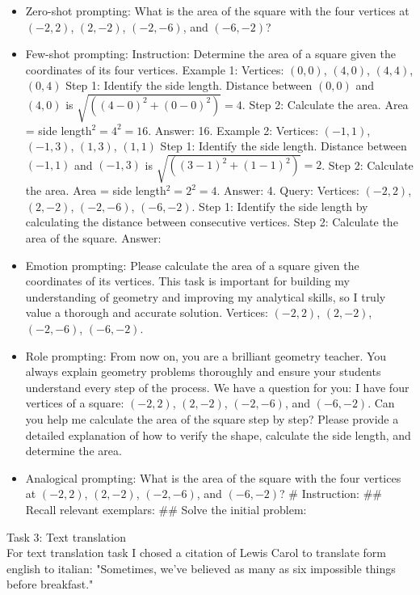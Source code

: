 \begin{itemize}
    \item Zero-shot prompting: What is the area of the square with the four vertices at $(-2, 2)$, $(2, -2)$, $(-2, -6)$, and $(-6, -2)$?
    \item Few-shot prompting: Instruction: Determine the area of a square given the coordinates of its four vertices. 
    Example 1: Vertices: $(0, 0)$, $(4, 0)$, $(4, 4)$, $(0, 4)$ 
    Step 1: Identify the side length. Distance between $(0, 0)$ and $(4, 0)$ is $\sqrt{((4 - 0)^2 + (0 - 0)^2)} = 4$. 
    Step 2: Calculate the area. Area = side length$^2 = 4^2 = 16$. Answer: 16. 
    Example 2: Vertices: $(-1, 1)$, $(-1, 3)$, $(1, 3)$, $(1, 1)$ 
    Step 1: Identify the side length. Distance between $(-1, 1)$ and $(-1, 3)$ is $\sqrt{((3 - 1)^2 + (1 - 1)^2)} = 2$. 
    Step 2: Calculate the area. Area = side length$^2 = 2^2 = 4$. Answer: 4. 
    Query: Vertices: $(-2, 2)$, $(2, -2)$, $(-2, -6)$, $(-6, -2)$. 
    Step 1: Identify the side length by calculating the distance between consecutive vertices. 
    Step 2: Calculate the area of the square. Answer:
    \item Emotion prompting: Please calculate the area of a square given the coordinates of its vertices. This task is important for building my understanding of geometry and improving my analytical skills, so I truly value a thorough and accurate solution. Vertices: $(-2, 2)$, $(2, -2)$, $(-2, -6)$, $(-6, -2)$.
    \item Role prompting: From now on, you are a brilliant geometry teacher. You always explain geometry problems thoroughly and ensure your students understand every step of the process. We have a question for you: I have four vertices of a square: $(-2, 2)$, $(2, -2)$, $(-2, -6)$, and $(-6, -2)$. Can you help me calculate the area of the square step by step? Please provide a detailed explanation of how to verify the shape, calculate the side length, and determine the area.
    \item Analogical prompting: What is the area of the square with the four vertices at $(-2, 2)$, $(2, -2)$, $(-2, -6)$, and $(-6, -2)$? \# Instruction: \#\# Recall relevant exemplars: \#\# Solve the initial problem:
\end{itemize}
Task 3: Text translation\\
For text translation task I chosed a citation of Lewis Carol \cite{carol} to translate form english to italian: "Sometimes, we've believed as many as six impossible things before breakfast."
